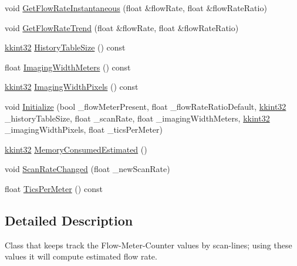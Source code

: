 \begin{DoxyCompactItemize}
\item 
void \hyperlink{class_k_k_l_s_c_1_1_flow_meter_tracker_a3e38494a55a7cfa9b4848d8e898f4364}{Get\+Flow\+Rate\+Instantaneous} (float \&flow\+Rate, float \&flow\+Rate\+Ratio)
\item 
void \hyperlink{class_k_k_l_s_c_1_1_flow_meter_tracker_a3d1c1382398a02264f7a8d64592fbbc5}{Get\+Flow\+Rate\+Trend} (float \&flow\+Rate, float \&flow\+Rate\+Ratio)
\item 
\hyperlink{namespace_k_k_b_a8fa4952cc84fda1de4bec1fbdd8d5b1b}{kkint32} \hyperlink{class_k_k_l_s_c_1_1_flow_meter_tracker_a35c33841d559b871e52862fdb4c89257}{History\+Table\+Size} () const 
\item 
float \hyperlink{class_k_k_l_s_c_1_1_flow_meter_tracker_a52d9a3d9c584520b255788ddb72a2772}{Imaging\+Width\+Meters} () const 
\item 
\hyperlink{namespace_k_k_b_a8fa4952cc84fda1de4bec1fbdd8d5b1b}{kkint32} \hyperlink{class_k_k_l_s_c_1_1_flow_meter_tracker_a6b284bd361debbc938646c5f61b0752a}{Imaging\+Width\+Pixels} () const 
\item 
void \hyperlink{class_k_k_l_s_c_1_1_flow_meter_tracker_a5fd668e3e541ac0d64bb5700f29dcfe9}{Initialize} (bool \+\_\+flow\+Meter\+Present, float \+\_\+flow\+Rate\+Ratio\+Default, \hyperlink{namespace_k_k_b_a8fa4952cc84fda1de4bec1fbdd8d5b1b}{kkint32} \+\_\+history\+Table\+Size, float \+\_\+scan\+Rate, float \+\_\+imaging\+Width\+Meters, \hyperlink{namespace_k_k_b_a8fa4952cc84fda1de4bec1fbdd8d5b1b}{kkint32} \+\_\+imaging\+Width\+Pixels, float \+\_\+tics\+Per\+Meter)
\item 
\hyperlink{namespace_k_k_b_a8fa4952cc84fda1de4bec1fbdd8d5b1b}{kkint32} \hyperlink{class_k_k_l_s_c_1_1_flow_meter_tracker_a2598984defe635c20f97315d91965857}{Memory\+Consumed\+Estimated} ()
\item 
void \hyperlink{class_k_k_l_s_c_1_1_flow_meter_tracker_ad870c6bf344de81de931651f4d1ca7ab}{Scan\+Rate\+Changed} (float \+\_\+new\+Scan\+Rate)
\item 
float \hyperlink{class_k_k_l_s_c_1_1_flow_meter_tracker_ac70a63d4866311c7d2e31f9fec8a8e82}{Tics\+Per\+Meter} () const 
\end{DoxyCompactItemize}


\subsection{Detailed Description}
Class that keeps track the Flow-\/\+Meter-\/\+Counter values by scan-\/lines; using these values it will compute estimated flow rate. 


